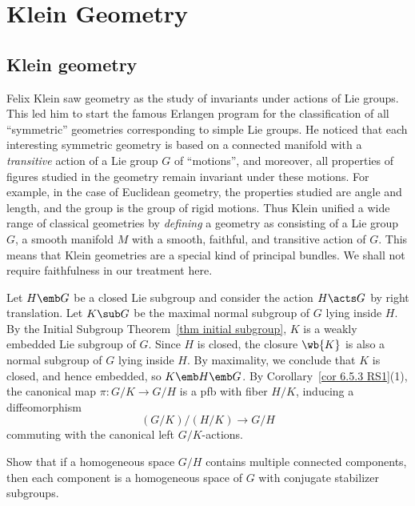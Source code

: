 \chapter{Klein Geometry}\label{chap: Klein geom}

\section{Klein geometry}

Felix Klein saw geometry as the study of invariants under actions of Lie groups. This led him to start the famous Erlangen program for the classification of all ``symmetric'' geometries corresponding to simple Lie groups. He noticed that each interesting symmetric geometry is based on a connected manifold with a \emph{transitive} action of a Lie group $G$ of ``motions'', and moreover, all properties of figures studied in the geometry remain invariant under these motions. For example, in the case of Euclidean geometry, the properties studied are angle and length, and the group is the group of rigid motions. Thus Klein unified a wide range of classical geometries by \emph{defining} a geometry as consisting of a Lie group $G$, a smooth manifold $M$ with a smooth, faithful, and transitive action of $G$. This means that Klein geometries are a special kind of principal bundles. We shall not require faithfulness in our treatment here.

Let $H\emb G$ be a closed Lie subgroup and consider the action $H\acts G$ by right translation. Let $K\sub G$ be the maximal normal subgroup of $G$ lying inside $H$. By the Initial Subgroup Theorem~\ref{thm initial subgroup}, $K$ is a weakly embedded Lie subgroup of $G$. Since $H$ is closed, the closure $\wb{K}$ is also a normal subgroup of $G$ lying inside $H$. By maximality, we conclude that $K$ is closed, and hence embedded, so $K\emb H\emb G$. By Corollary~\ref{cor 6.5.3 RS1}(1), the canonical map $\pi:G\slash K\to G\slash H$ is a \gls{pfb} with fiber $H\slash K$, inducing a diffeomorphism
\[(G\slash K)\slash (H\slash K)\to G\slash H\]
commuting with the canonical left $G\slash K$-actions.

\begin{xca}
    Show that if a homogeneous space $G\slash H$ contains multiple connected components, then each component is a homogeneous space of $G$ with conjugate stabilizer subgroups.
\end{xca}

